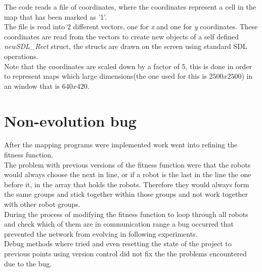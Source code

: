The code reads a file of coordinates, where the coordinates represent a cell in the map that has been marked as '1'.\\
The file is read into 2 different vectors, one for \textit{x} and one for \textit{y} coordinates. These coordinates are read from the vectors to create new objects of a self defined \textit{newSDL\_Rect} struct, the structs are drawn on the screen using standard SDL operations. \\
Note that the coordinates are scaled down by a factor of 5, this is done in order to represent maps which large dimensions(the one used for this is $2500 x 2500$) in an window that is $640 x 420$. 

\section{Non-evolution bug}
After the mapping programs were implemented work went into refining the fitness function. \\
The problem with previous versions of the fitness function were that the robots would always choose the next in line, or if a robot is the last in the line the one before it, in the array that holds the robots. Therefore they would always form the  same groups and stick together within those groups and not work together with other robot groups.\\
During the process of modifying the fitness function to loop through all robots and check which of them are in communication range a bug occurred that prevented the network from evolving in following experiments. \\
Debug methods where tried and even resetting the state of the project to previous points using version control did not fix the the problems encountered due to the bug. \\


